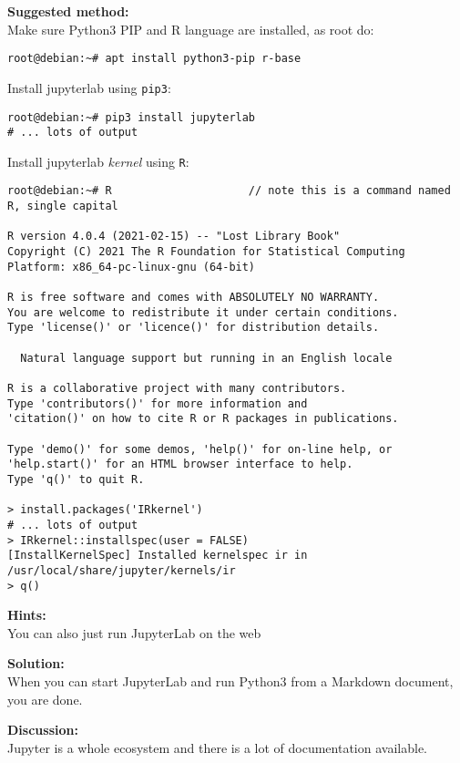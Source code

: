 \documentclass[a4paper,11pt,notitlepage]{report}
\begin{document}
{\bf Suggested method:}\\
Make sure Python3 PIP and R language are installed, as root do:
\begin{verbatim}
root@debian:~# apt install python3-pip r-base
\end{verbatim}

Install jupyterlab using \verb+pip3+:
\begin{verbatim}
root@debian:~# pip3 install jupyterlab
# ... lots of output
\end{verbatim}

\eject

Install jupyterlab \emph{kernel} using \verb+R+:
\begin{verbatim}
root@debian:~# R                     // note this is a command named R, single capital

R version 4.0.4 (2021-02-15) -- "Lost Library Book"
Copyright (C) 2021 The R Foundation for Statistical Computing
Platform: x86_64-pc-linux-gnu (64-bit)

R is free software and comes with ABSOLUTELY NO WARRANTY.
You are welcome to redistribute it under certain conditions.
Type 'license()' or 'licence()' for distribution details.

  Natural language support but running in an English locale

R is a collaborative project with many contributors.
Type 'contributors()' for more information and
'citation()' on how to cite R or R packages in publications.

Type 'demo()' for some demos, 'help()' for on-line help, or
'help.start()' for an HTML browser interface to help.
Type 'q()' to quit R.

> install.packages('IRkernel')
# ... lots of output
> IRkernel::installspec(user = FALSE)
[InstallKernelSpec] Installed kernelspec ir in /usr/local/share/jupyter/kernels/ir
> q()
\end{verbatim}



{\bf Hints:}\\
You can also just run JupyterLab on the web \smiley

{\bf Solution:}\\
When you can start JupyterLab and run Python3 from a Markdown document, you are done.


{\bf Discussion:}\\
Jupyter is a whole ecosystem and there is a lot of documentation available.
\end{document}
